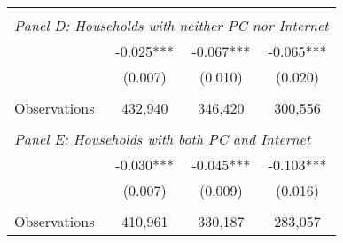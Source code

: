 {\begin{tabular}{lccc}
&  &  &   \\
\multicolumn{4}{l}{\textit{Panel D: Households with neither PC nor Internet}} \\
\hspace{3mm}        &      -0.025***&      -0.067***&      -0.065***\\
                    &     (0.007)   &     (0.010)   &     (0.020)   \\
                    &               &               &               \\
\hspace{3mm}Observations&     432,940   &     346,420   &     300,556   \\
 
&  &  &   \\
\multicolumn{4}{l}{\textit{Panel E: Households with both PC and Internet}} \\
\hspace{3mm}        &      -0.030***&      -0.045***&      -0.103***\\
                    &     (0.007)   &     (0.009)   &     (0.016)   \\
                    &               &               &               \\
\hspace{3mm}Observations&     410,961   &     330,187   &     283,057   \\
 

\bottomrule
\end{tabular}
}

